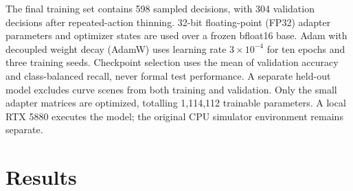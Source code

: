 \documentclass[10pt,a4paper]{article}
\begin{document}
The final training set contains 598 sampled decisions, with 304 validation decisions after repeated-action thinning. 32-bit floating-point (FP32) adapter parameters and optimizer states are used over a frozen bfloat16 base. Adam with decoupled weight decay (AdamW) uses learning rate $3\times10^{-4}$ for ten epochs and three training seeds. Checkpoint selection uses the mean of validation accuracy and class-balanced recall, never formal test performance. A separate held-out model excludes curve scenes from both training and validation. Only the small adapter matrices are optimized, totalling 1,114,112 trainable parameters. A local RTX 5880 executes the model; the original CPU simulator environment remains separate.

\section{Results}
\end{document}

